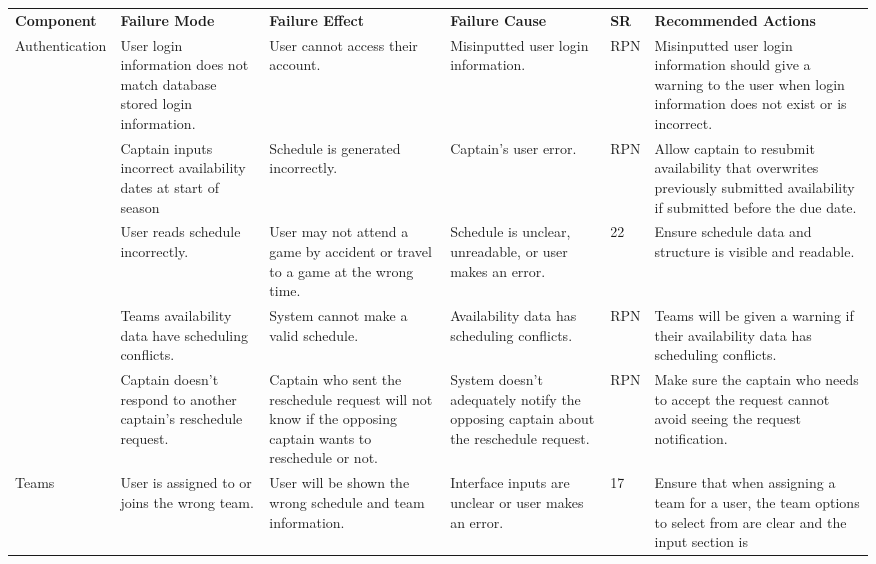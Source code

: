 \documentclass{article}
\begin{document}
\begin{landscape}
\thispagestyle{empty}
\vspace*{-3.25cm}
\hspace*{-3.25cm}
\def\arraystretch{1.3}
\begin{tabularx}{504pt}{|p{3cm}||p{4cm}|p{4cm}|p{4cm}|p{1cm}|p{5.75cm}|}
\cline{1-6}
\textbf{Component} & \textbf{Failure Mode} & \textbf{Failure Effect} & \textbf{Failure Cause} & \textbf{SR} & \textbf{Recommended Actions}\\
\cline{1-6}
\multirow{2}{2cm}{Authentication} & User login information does not match database stored
login information. & User cannot access their account. & Misinputted user login information.
& RPN & Misinputted user login information should give a warning to the user when
login information does not exist or is incorrect.\\
\cline{1-6}
\multirow{2}{2cm}{Scheduling} & Captain inputs incorrect availability dates at
start of season & Schedule is generated incorrectly. & Captain's user error. &
RPN & Allow captain to resubmit availability that overwrites previously
submitted availability if submitted before the due date.\\
\cline{2-6}
& User reads schedule incorrectly. & User may not attend a game by accident or
travel to a game at the wrong time. & Schedule is unclear, unreadable, or user
makes an error. & 22 & Ensure schedule data and structure is visible and
readable.\\
\cline{2-6}
& Teams availability data have scheduling conflicts. & System cannot make a
valid schedule. & Availability data has scheduling conflicts. & RPN & Teams
will be given a warning if their availability data has scheduling conflicts.\\
\cline{2-6}
& Captain doesn't respond to another captain's reschedule request. & Captain
who sent the reschedule request will not know if the opposing captain wants to
reschedule or not. & System doesn't adequately notify the opposing captain
about the reschedule request. & RPN & Make sure the captain who needs to
accept the request cannot avoid seeing the request notification.\\
\cline{1-6}
\multirow{2}{2cm}{Teams} & User is assigned to or joins the wrong team. & User
will be shown the wrong schedule and team information. & Interface inputs are
unclear or user makes an error. & 17 & Ensure that when assigning a team for a
user, the team options to select from are clear and the input section is

\end{tabularx}
\end{landscape}
\end{document}

